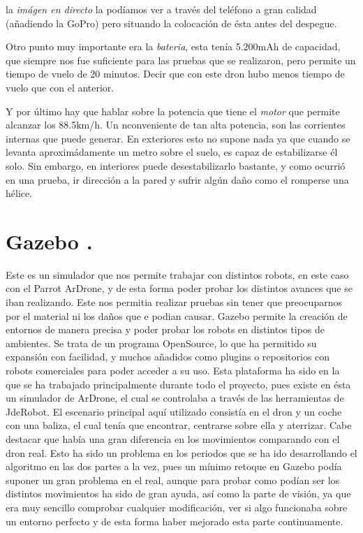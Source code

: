 \hspace{1 cm} la \textsl{im\'agen en directo} la pod\'iamos ver a trav\'es del tel\'efono a gran calidad (añadiendo la GoPro) pero situando la colocaci\'on de \'esta antes del despegue.

\hspace{1 cm} Otro punto muy importante era la \textsl{bateria}, esta ten\'ia  5.200mAh de capacidad, que siempre nos fue suficiente para las pruebas que se realizaron, pero permite un tiempo de vuelo de 20 minutos. Decir que con este dron hubo menos tiempo de vuelo que con el anterior.

\hspace{1 cm} Y por \'ultimo hay que hablar sobre la potencia que tiene el \textsl{motor} que permite alcanzar los 88.5km/h. Un nconveniente de tan alta potencia, son las corrientes internas que puede generar. En exteriores esto no supone nada ya que cuando se levanta aproxim\'adamente un metro sobre el suelo, es capaz de estabilizarse \'el solo. Sin embargo, en interiores puede desestabilizarlo bastante, y como ocurri\'o en una prueba, ir direcci\'on a la pared y sufrir alg\'un daño como el romperse una h\'elice.

\section{Gazebo .}
\hspace{1 cm} Este es un simulador que nos permite trabajar con distintos robots, en este caso con el Parrot ArDrone, y de esta forma poder probar los distintos avances que se iban realizando. Este nos permitia realizar pruebas sin tener que preocuparnos por el material ni los daños que e podian causar.  Gazebo permite la creaci\'on de entornos de manera precisa y poder probar los robots en distintos tipos de ambientes. Se trata de un programa OpenSource, lo que ha permitido su expansi\'on con facilidad, y muchos añadidos como plugins o repositorios con robots comerciales para poder acceder a su uso. Esta plataforma ha sido en la que se ha trabajado principalmente durante todo el proyecto, pues existe en \'esta un simulador de ArDrone, el cual se controlaba a trav\'es de las herramientas de JdeRobot. El escenario principal aqu\'i utilizado consist\'ia en el dron y un coche con una baliza, el cual ten\'ia que encontrar, centrarse sobre ella y aterrizar. Cabe destacar que hab\'ia una gran diferencia en los movimientos comparando con el dron real. Esto ha sido un problema en los periodos que se ha ido desarrollando el algoritmo en las dos partes a la vez, pues un m\'inimo retoque en Gazebo pod\'ia suponer un gran problema en el real, aunque para probar como pod\'ian ser los distintos movimientos ha sido de gran ayuda, as\'i como la parte de visi\'on, ya que era muy sencillo comprobar cualquier modificaci\'on, ver si algo funcionaba sobre un entorno perfecto y de esta forma haber mejorado esta parte continuamente.

